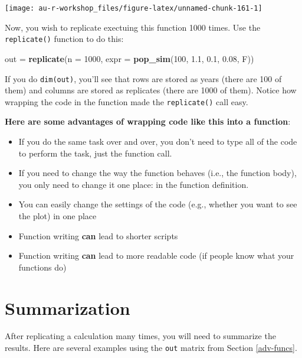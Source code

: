 \documentclass[]{book}
\newenvironment{Shaded}{\begin{snugshade}}{\end{snugshade}}
\newcommand{\KeywordTok}[1]{\textcolor[rgb]{0.13,0.29,0.53}{\textbf{#1}}}
\newcommand{\DataTypeTok}[1]{\textcolor[rgb]{0.13,0.29,0.53}{#1}}
\newcommand{\DecValTok}[1]{\textcolor[rgb]{0.00,0.00,0.81}{#1}}
\newcommand{\FloatTok}[1]{\textcolor[rgb]{0.00,0.00,0.81}{#1}}
\newcommand{\StringTok}[1]{\textcolor[rgb]{0.31,0.60,0.02}{#1}}
\newcommand{\NormalTok}[1]{#1}
\providecommand{\tightlist}{%
  \setlength{\itemsep}{0pt}\setlength{\parskip}{0pt}}
\theoremstyle{definition}
\theoremstyle{definition}
\theoremstyle{definition}
\theoremstyle{remark}
\begin{document}
\begin{center}\texttt{[image: au-r-workshop\_files/figure-latex/unnamed-chunk-161-1]} \end{center}

Now, you wish to replicate exectuing this function 1000 times. Use the
\texttt{replicate()} function to do this:

\begin{Shaded}
\begin{Highlighting}[]
\NormalTok{out =}\StringTok{ }\KeywordTok{replicate}\NormalTok{(}\DataTypeTok{n =} \DecValTok{1000}\NormalTok{, }\DataTypeTok{expr =} \KeywordTok{pop_sim}\NormalTok{(}\DecValTok{100}\NormalTok{, }\FloatTok{1.1}\NormalTok{, }\FloatTok{0.1}\NormalTok{, }\FloatTok{0.08}\NormalTok{, F))}
\end{Highlighting}
\end{Shaded}

If you do \texttt{dim(out)}, you'll see that rows are stored as years
(there are 100 of them) and columns are stored as replicates (there are
1000 of them). Notice how wrapping the code in the function made the
\texttt{replicate()} call easy.

\textbf{Here are some advantages of wrapping code like this into a
function}:

\begin{itemize}
\tightlist
\item
  If you do the same task over and over, you don't need to type all of
  the code to perform the task, just the function call.
\item
  If you need to change the way the function behaves (i.e., the function
  body), you only need to change it one place: in the function
  definition.
\item
  You can easily change the settings of the code (e.g., whether you want
  to see the plot) in one place
\item
  Function writing \textbf{can} lead to shorter scripts
\item
  Function writing \textbf{can} lead to more readable code (if people
  know what your functions do)
\end{itemize}

\section{Summarization}\label{mc-summaries}

After replicating a calculation many times, you will need to summarize
the results. Here are several examples using the \texttt{out} matrix
from Section \ref{adv-funcs}.
\end{document}
